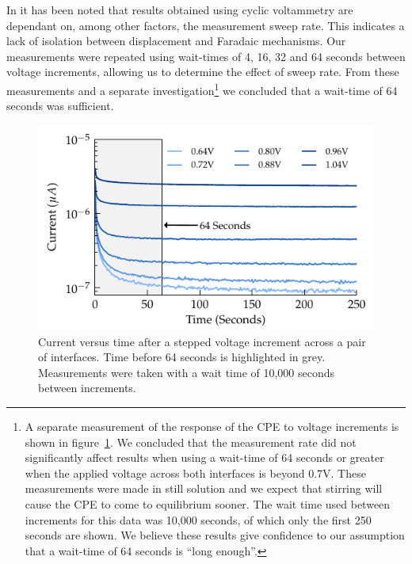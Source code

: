 \documentclass[10pt,final,journal]{IEEEtran}
\begin{document}
In \cite{Cogan2008} it has been noted that results obtained using cyclic voltammetry are dependant on, among other factors, the measurement sweep rate. This indicates a lack of isolation between displacement and Faradaic mechanisms. Our measurements were repeated using wait-times of 4, 16, 32 and 64 seconds between voltage increments, allowing us to determine the effect of sweep rate. From these measurements and a separate investigation\footnote{A separate measurement of the response of the CPE to voltage increments is shown in figure~\ref{fig:CPE_currentVsTime}. We concluded that the measurement rate did not significantly affect results when using a wait-time of 64 seconds or greater when the applied voltage across both interfaces is beyond 0.7\thinspace V. These measurements were made in still solution and we expect that stirring will cause the CPE to come to equilibrium sooner. The wait time used between increments for this data was 10,000 seconds, of which only the first 250 seconds are shown. We believe these results give confidence to our assumption that a wait-time of 64 seconds is ``long enough''.} we concluded that a wait-time of 64 seconds was sufficient.  
\begin{figure}
    \begin{center}
        \includegraphics{graphics/CPE_currentVsTime}
    \end{center}
    \caption{Current versus time after a stepped voltage increment across a pair of interfaces. Time before 64 seconds is highlighted in grey. Measurements were taken with a wait time of 10,000 seconds between increments.}
    \label{fig:CPE_currentVsTime}
\end{figure}
\end{document}
